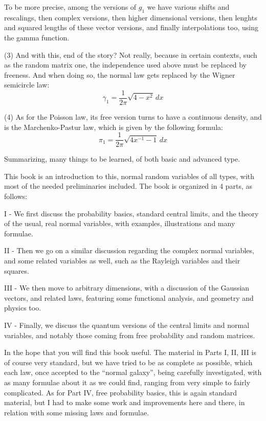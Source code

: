 \documentclass[12pt]{amsbook}
\begin{document}
To be more precise, among the versions of $g_1$ we have various shifts and rescalings, then complex versions, then higher dimensional versions, then lenghts and squared lengths of these vector versions, and finally interpolations too, using the gamma function.

\bigskip

(3) And with this, end of the story? Not really, because in certain contexts, such as the random matrix one, the independence used above must be replaced by freeness. And when doing so, the normal law gets replaced by the Wigner semicircle law:
$$\gamma_1=\frac{1}{2\pi}\sqrt{4-x^2}\,dx$$

(4) As for the Poisson law, its free version turns to have a continuous density, and is the Marchenko-Pastur law, which is given by the following formula:
$$\pi_1=\frac{1}{2\pi}\sqrt{4x^{-1}-1}\,dx$$

Summarizing, many things to be learned, of both basic and advanced type. 

\bigskip

This book is an introduction to this, normal random variables of all types, with most of the needed preliminaries included. The book is organized in 4 parts, as follows:

\bigskip

I - We first discuss the probability basics, standard central limits, and the theory of the usual, real normal variables, with examples, illustrations and many formulae. 

\bigskip

II - Then we go on a similar discussion regarding the complex normal variables, and some related variables as well, such as the Rayleigh variables and their squares.

\bigskip

III - We then move to arbitrary dimensions, with a discussion of the Gaussian vectors, and related laws, featuring some functional analysis, and geometry and physics too. 

\bigskip

IV - Finally, we discuss the quantum versions of the central limits and normal variables, and notably those coming from free probability and random matrices.

\bigskip

In the hope that you will find this book useful. The material in Parts I, II, III is of course very standard, but we have tried to be as complete as possible, which each law, once accepted to the ``normal galaxy'', being carefully investigated, with as many formulae about it as we could find, ranging from very simple to fairly complicated. As for Part IV, free probability basics, this is again standard material, but I had to make some work and improvements here and there, in relation with some missing laws and formulae.
\end{document}
